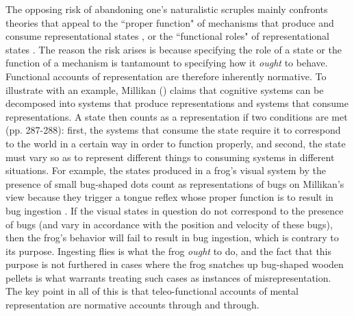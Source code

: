 The opposing risk of abandoning one's naturalistic scruples mainly confronts theories that appeal to the ``proper function" of mechanisms that produce and consume representational states \citep{Millikan:1989,Millikan:2005,Dretske:1986}, or the ``functional roles" of representational states \citep{Block:1986,Harman:1982,Eliasmith:2000}. The reason the risk arises is because specifying the role of a state or the function of a mechanism is tantamount to specifying how it \textit{ought} to behave. Functional accounts of representation are therefore inherently normative. To illustrate with an example, Millikan (\citeyear{Millikan:1989}) claims that cognitive systems can be decomposed into systems that produce representations and systems that consume representations. A state then counts as a representation if two conditions are met (pp. 287-288): first, the systems that consume the state require it to correspond to the world in a certain way in order to function properly, and second, the state must vary so as to represent different things to consuming systems in different situations. For example, the states produced in a frog's visual system by the presence of small bug-shaped dots count as representations of bugs on Millikan's view because they trigger a tongue reflex whose proper function is to result in bug ingestion \citep[][p. 291]{Millikan:1989}. If the visual states in question do not correspond to the presence of bugs (and vary in accordance with the position and velocity of these bugs), then the frog's behavior will fail to result in bug ingestion, which is contrary to its purpose. Ingesting flies is what the frog \textit{ought} to do, and the fact that this purpose is not furthered in cases where the frog snatches up bug-shaped wooden pellets is what warrants treating such cases as instances of misrepresentation. The key point in all of this is that teleo-functional accounts of mental representation are normative accounts through and through. 

